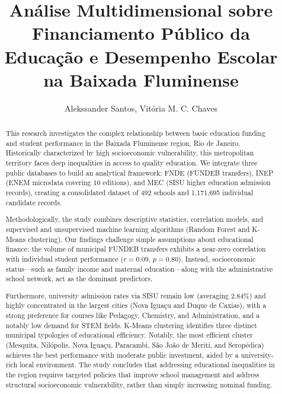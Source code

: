 \documentclass[12pt]{article}
\title{Análise Multidimensional sobre Financiamento Público da Educação e
Desempenho Escolar na Baixada Fluminense}
\author{Alekssander Santos\inst{1}, Vitória M. C. Chaves\inst{1}}
\begin{document}
\maketitle

\begin{abstract}
This research investigates the complex relationship between basic education funding and student performance in the Baixada Fluminense region, Rio de Janeiro. Historically characterized by high socioeconomic vulnerability, this metropolitan territory faces deep inequalities in access to quality education. We integrate three public databases to build an analytical framework: FNDE (FUNDEB transfers), INEP (ENEM microdata covering 10 editions), and MEC (SISU higher education admission records), creating a consolidated dataset of 492 schools and 1,171,695 individual candidate records.

Methodologically, the study combines descriptive statistics, correlation models, and supervised and unsupervised machine learning algorithms (Random Forest and K-Means clustering). Our findings challenge simple assumptions about educational finance: the volume of municipal FUNDEB transfers exhibits a near-zero correlation with individual student performance ($r = 0{.}09$, $p = 0{.}80$). Instead, socioeconomic status---such as family income and maternal education---along with the administrative school network, act as the dominant predictors.

Furthermore, university admission rates via SISU remain low (averaging 2.84\%) and highly concentrated in the largest cities (Nova Iguaçu and Duque de Caxias), with a strong preference for courses like Pedagogy, Chemistry, and Administration, and a notably low demand for STEM fields. K-Means clustering identifies three distinct municipal typologies of educational efficiency. Notably, the most efficient cluster (Mesquita, Nilópolis, Nova Iguaçu, Paracambi, São João de Meriti, and Seropédica) achieves the best performance with moderate public investment, aided by a university-rich local environment. The study concludes that addressing educational inequalities in the region requires targeted policies that improve school management and address structural socioeconomic vulnerability, rather than simply increasing nominal funding.
\end{abstract}
\end{document}
